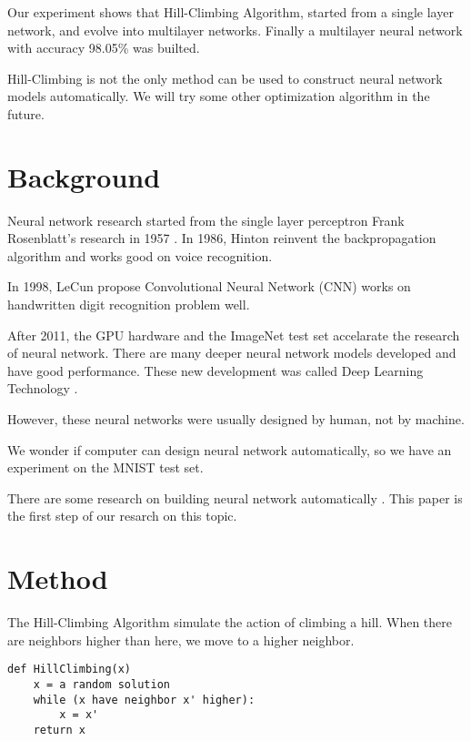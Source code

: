 \documentclass{article}
\begin{document}
Our experiment shows that Hill-Climbing Algorithm, started from a single layer network, and evolve into multilayer networks. Finally a multilayer neural network with accuracy 98.05\% was builted.

Hill-Climbing is not the only method can be used to construct neural network models automatically. We will try some other optimization algorithm in the future.


\section{Background}
Neural network research started from the single layer perceptron Frank Rosenblatt's research in 1957 \cite{Rosenblatt1958ThePA}. In 1986, Hinton reinvent the backpropagation algorithm \cite{Rumelhart1986LearningRB}  and works good on voice recognition. 

In 1998, LeCun \cite{LeCun1998GradientbasedLA} propose Convolutional Neural Network (CNN) works on handwritten digit recognition problem well. 

After 2011, the GPU hardware and the ImageNet test set accelarate the research of neural network. There are many deeper neural network models developed and have good performance. These new development was called Deep Learning Technology \cite{Szegedy2015GoingDW} \cite{Ioffe2015BatchNA} \cite{Chollet2017XceptionDL}.

However, these neural networks were usually designed by human, not by machine.

We wonder if computer can design neural network automatically, so we have an experiment on the MNIST test set.

There are some research on building neural network automatically \cite{Mendoza2019TowardsAD} \cite{Abreu2019AutoNN} . This paper is the first step of our resarch on this topic. 

\section{Method}

The Hill-Climbing Algorithm simulate the action of climbing a hill. When there are neighbors higher than here, we move to a higher neighbor. 

\begin{minipage}{\linewidth}
\begin{lstlisting}
def HillClimbing(x)
    x = a random solution
    while (x have neighbor x' higher):
        x = x'
    return x
\end{lstlisting}
\end{minipage}
\end{document}
